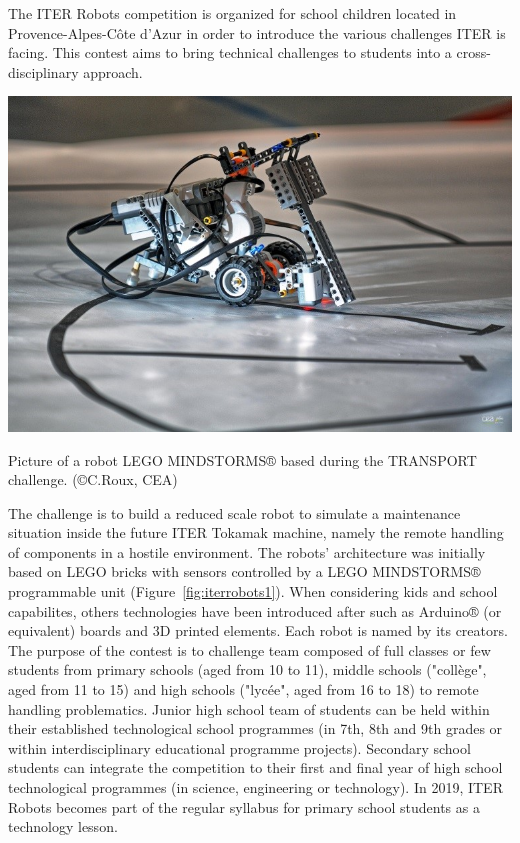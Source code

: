The ITER Robots competition is organized for school children located in Provence-Alpes-Côte d’Azur in order to introduce the various challenges ITER is facing. This contest aims to bring technical challenges to students into a cross-disciplinary approach.
\begin{marginfigure}
	\centering
	\includegraphics[width=1.0\linewidth]{figures/chap5/ITER_Robots_1}
	\caption{Picture of a robot LEGO MINDSTORMS® based during the TRANSPORT challenge. (©C.Roux, CEA)}
	\label{fig:iterrobots1}
\end{marginfigure}
The challenge is to build a reduced scale robot to simulate a maintenance situation inside the future ITER Tokamak machine, namely the remote handling of components in a hostile environment. The robots' architecture was initially based on LEGO bricks with sensors controlled by a LEGO MINDSTORMS® programmable unit (Figure~\ref{fig:iterrobots1}). When considering kids and school capabilites, others technologies  have been introduced after such as Arduino® (or equivalent) boards and 3D printed elements. Each robot is named by its creators. The purpose of the contest is to challenge team composed of full classes or few students from primary schools (aged from 10 to 11), middle schools ("collège", aged from 11 to 15) and high schools ("lycée", aged from 16 to 18) to remote handling problematics. Junior high school team of students can be held within their established technological school programmes (in 7th, 8th and 9th grades or within interdisciplinary educational programme projects). Secondary school students can integrate the competition to their first and final year of high school technological programmes (in science, engineering or technology). In 2019, ITER Robots becomes part of the regular syllabus for primary school students as a technology lesson.

